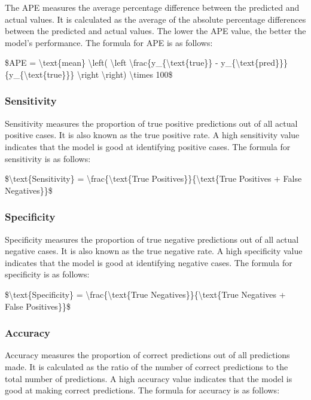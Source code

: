The APE measures the average percentage difference between the predicted
and actual values. It is calculated as the average of the absolute
percentage differences between the predicted and actual values. The
lower the APE value, the better the model's performance. The formula for
APE is as follows:

\$APE = \textbackslash text\{mean\} \textbackslash left(
\textbackslash left\textbar{}
\textbackslash frac\{y\_\{\textbackslash text\{true\}\} -
y\_\{\textbackslash text\{pred\}\}\}\{y\_\{\textbackslash text\{true\}\}\}
\textbackslash right\textbar{} \textbackslash right)
\textbackslash times 100\$

\hypertarget{sensitivity}{%
\subsubsection{Sensitivity}\label{sensitivity}}

Sensitivity measures the proportion of true positive predictions out of
all actual positive cases. It is also known as the true positive rate. A
high sensitivity value indicates that the model is good at identifying
positive cases. The formula for sensitivity is as follows:

\$\textbackslash text\{Sensitivity\} =
\textbackslash frac\{\textbackslash text\{True
Positives\}\}\{\textbackslash text\{True Positives + False
Negatives\}\}\$

\hypertarget{specificity}{%
\subsubsection{Specificity}\label{specificity}}

Specificity measures the proportion of true negative predictions out of
all actual negative cases. It is also known as the true negative rate. A
high specificity value indicates that the model is good at identifying
negative cases. The formula for specificity is as follows:

\$\textbackslash text\{Specificity\} =
\textbackslash frac\{\textbackslash text\{True
Negatives\}\}\{\textbackslash text\{True Negatives + False
Positives\}\}\$

\hypertarget{accuracy}{%
\subsubsection{Accuracy}\label{accuracy}}

Accuracy measures the proportion of correct predictions out of all
predictions made. It is calculated as the ratio of the number of correct
predictions to the total number of predictions. A high accuracy value
indicates that the model is good at making correct predictions. The
formula for accuracy is as follows:

